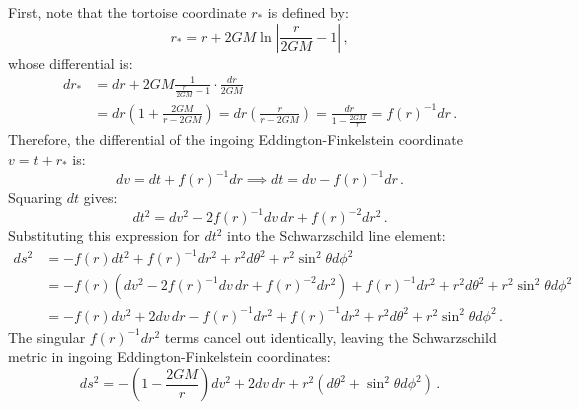\documentclass[12pt]{article}
\newcommand{\be}{\begin{equation}}
\newcommand{\ee}{\end{equation}}
\begin{document}
\begin{enumerate}[label=\alph*)]
First, note that the tortoise coordinate $r_*$ is defined by:
\be
r_* = r + 2GM \ln\left| \frac{r}{2GM} - 1 \right| \,,
\ee
whose differential is:
\begin{align}
dr_* &= dr + 2GM \frac{1}{\frac{r}{2GM} - 1} \cdot \frac{dr}{2GM} \nonumber\\
&= dr \left( 1 + \frac{2GM}{r - 2GM} \right) = dr \left( \frac{r}{r - 2GM} \right) = \frac{dr}{1 - \frac{2GM}{r}} = f(r)^{-1} dr \,.
\end{align}
Therefore, the differential of the ingoing Eddington-Finkelstein coordinate $v = t + r_*$ is:
\be
dv = dt + f(r)^{-1} dr \implies dt = dv - f(r)^{-1} dr \,.
\ee
Squaring $dt$ gives:
\be
dt^2 = dv^2 - 2 f(r)^{-1} dv \, dr + f(r)^{-2} dr^2 \,.
\ee
Substituting this expression for $dt^2$ into the Schwarzschild line element:
\begin{align}
ds^2 &= -f(r) dt^2 + f(r)^{-1} dr^2 + r^2 d\theta^2 + r^2 \sin^2\theta d\phi^2 \nonumber\\
&= -f(r) \left( dv^2 - 2 f(r)^{-1} dv \, dr + f(r)^{-2} dr^2 \right) + f(r)^{-1} dr^2 + r^2 d\theta^2 + r^2 \sin^2\theta d\phi^2 \nonumber\\
&= -f(r) dv^2 + 2 dv \, dr - f(r)^{-1} dr^2 + f(r)^{-1} dr^2 + r^2 d\theta^2 + r^2 \sin^2\theta d\phi^2 \,.
\end{align}
The singular $f(r)^{-1} dr^2$ terms cancel out identically, leaving the Schwarzschild metric in ingoing Eddington-Finkelstein coordinates:
\be
\boxed{ds^2 = -\left(1 - \frac{2GM}{r}\right) dv^2 + 2 dv \, dr + r^2 \left( d\theta^2 + \sin^2\theta d\phi^2 \right) \,.}
\ee


\end{enumerate}
\end{document}
